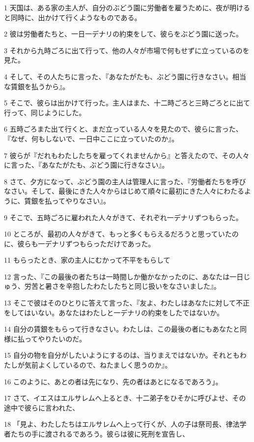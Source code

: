 \par 1 天国は、ある家の主人が、自分のぶどう園に労働者を雇うために、夜が明けると同時に、出かけて行くようなものである。
\par 2 彼は労働者たちと、一日一デナリの約束をして、彼らをぶどう園に送った。
\par 3 それから九時ごろに出て行って、他の人々が市場で何もせずに立っているのを見た。
\par 4 そして、その人たちに言った、『あなたがたも、ぶどう園に行きなさい。相当な賃銀を払うから』。
\par 5 そこで、彼らは出かけて行った。主人はまた、十二時ごろと三時ごろとに出て行って、同じようにした。
\par 6 五時ごろまた出て行くと、まだ立っている人々を見たので、彼らに言った、『なぜ、何もしないで、一日中ここに立っていたのか』。
\par 7 彼らが『だれもわたしたちを雇ってくれませんから』と答えたので、その人々に言った、『あなたがたも、ぶどう園に行きなさい』。
\par 8 さて、夕方になって、ぶどう園の主人は管理人に言った、『労働者たちを呼びなさい。そして、最後にきた人々からはじめて順々に最初にきた人々にわたるように、賃銀を払ってやりなさい』。
\par 9 そこで、五時ごろに雇われた人々がきて、それぞれ一デナリずつもらった。
\par 10 ところが、最初の人々がきて、もっと多くもらえるだろうと思っていたのに、彼らも一デナリずつもらっただけであった。
\par 11 もらったとき、家の主人にむかって不平をもらして
\par 12 言った、『この最後の者たちは一時間しか働かなかったのに、あなたは一日じゅう、労苦と暑さを辛抱したわたしたちと同じ扱いをなさいました』。
\par 13 そこで彼はそのひとりに答えて言った、『友よ、わたしはあなたに対して不正をしてはいない。あなたはわたしと一デナリの約束をしたではないか。
\par 14 自分の賃銀をもらって行きなさい。わたしは、この最後の者にもあなたと同様に払ってやりたいのだ。
\par 15 自分の物を自分がしたいようにするのは、当りまえではないか。それともわたしが気前よくしているので、ねたましく思うのか』。
\par 16 このように、あとの者は先になり、先の者はあとになるであろう」。
\par 17 さて、イエスはエルサレムへ上るとき、十二弟子をひそかに呼びよせ、その途中で彼らに言われた、
\par 18 「見よ、わたしたちはエルサレムへ上って行くが、人の子は祭司長、律法学者たちの手に渡されるであろう。彼らは彼に死刑を宣告し、
